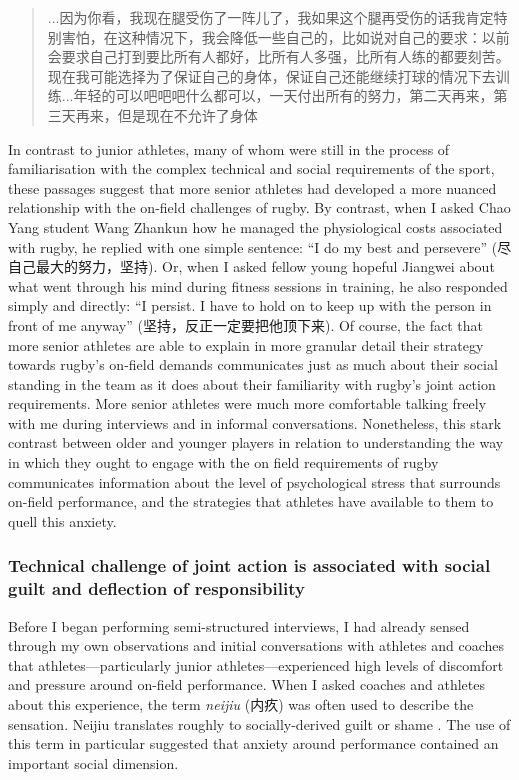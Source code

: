 \begin{CJK}{UTF8}{gbsn}
\begin{quote}
      ...因为你看，我现在腿受伤了一阵儿了，我如果这个腿再受伤的话我肯定特别害怕，在这种情况下，我会降低一些自己的，比如说对自己的要求：以前会要求自己打到要比所有人都好，比所有人多强，比所有人练的都要刻苦。现在我可能选择为了保证自己的身体，保证自己还能继续打球的情况下去训练...年轻的可以吧吧吧什么都可以，一天付出所有的努力，第二天再来，第三天再来，但是现在不允许了身体
\end{quote}

In contrast to junior athletes, many of whom were still in the process of familiarisation with the complex technical and social requirements of the sport, these passages suggest that more senior athletes had developed a more nuanced relationship with the on-field challenges of rugby.  By contrast, when I asked Chao Yang student Wang Zhankun how he managed the physiological costs associated with rugby, he replied with one simple sentence: ``I do my best and persevere'' (尽自己最大的努力，坚持).  Or, when I asked fellow young hopeful Jiangwei about what went through his mind during fitness sessions in training, he also responded simply and directly: ``I persist. I have to hold on to keep up with the person in front of me anyway'' (坚持，反正一定要把他顶下来).  Of course, the fact that more senior athletes are able to explain in more granular detail their strategy towards rugby’s on-field demands communicates just as much about their social standing in the team as it does about their familiarity with rugby’s joint action requirements.  More senior athletes were much more comfortable talking freely with me during interviews and in informal conversations.  Nonetheless, this stark contrast between older and younger players in relation to understanding the way in which they ought to engage with the on field requirements of rugby communicates information about the level of psychological stress that surrounds on-field performance, and the strategies that athletes have available to them to quell this anxiety.







\subsubsection{Technical challenge of joint action is associated with social guilt and deflection of responsibility}

Before I began performing semi-structured interviews, I had already sensed through my own observations and initial conversations with athletes and coaches that athletes---particularly junior athletes---experienced high levels of discomfort and pressure around on-field performance. When I asked coaches and athletes about this experience, the term \textit{neijiu} (内疚) was often used to describe the sensation.  Neijiu translates roughly to socially-derived guilt or shame \citep{Pleco2018}.  The use of this term in particular suggested that anxiety around performance contained an important social dimension.


\end{CJK}
